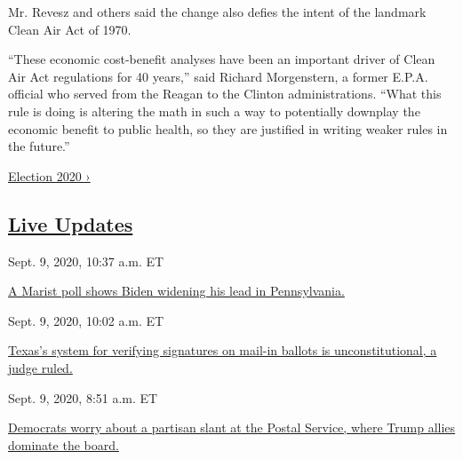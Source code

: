Mr. Revesz and others said the change also defies the intent of the
landmark Clean Air Act of 1970.

``These economic cost-benefit analyses have been an important driver of
Clean Air Act regulations for 40 years,'' said Richard Morgenstern, a
former E.P.A. official who served from the Reagan to the Clinton
administrations. ``What this rule is doing is altering the math in such
a way to potentially downplay the economic benefit to public health, so
they are justified in writing weaker rules in the future.''

\href{https://www.nytimes3xbfgragh.onion/news-event/2020-election}{Election
2020 ›}

\hypertarget{live-updates}{%
\subsection{\texorpdfstring{\href{https://www.nytimes3xbfgragh.onion/live/2020/09/09/us/trump-vs-biden}{Live
Updates}}{Live Updates}}\label{live-updates}}

\href{https://www.nytimes3xbfgragh.onion/live/2020/09/09/us/trump-vs-biden\#a-marist-poll-shows-biden-widening-his-lead-in-pennsylvania}{}

Sept. 9, 2020, 10:37 a.m. ET

\href{https://www.nytimes3xbfgragh.onion/live/2020/09/09/us/trump-vs-biden\#a-marist-poll-shows-biden-widening-his-lead-in-pennsylvania}{A
Marist poll shows Biden widening his lead in
Pennsylvania.}\href{https://www.nytimes3xbfgragh.onion/live/2020/09/09/us/trump-vs-biden\#texass-system-for-verifying-signatures-on-mail-in-ballots-is-unconstitutional-a-judge-ruled}{}

Sept. 9, 2020, 10:02 a.m. ET

\href{https://www.nytimes3xbfgragh.onion/live/2020/09/09/us/trump-vs-biden\#texass-system-for-verifying-signatures-on-mail-in-ballots-is-unconstitutional-a-judge-ruled}{Texas's
system for verifying signatures on mail-in ballots is unconstitutional,
a judge
ruled.}\href{https://www.nytimes3xbfgragh.onion/live/2020/09/09/us/trump-vs-biden\#democrats-worry-about-a-partisan-slant-at-the-postal-service-where-trump-allies-dominate-the-board}{}

Sept. 9, 2020, 8:51 a.m. ET

\href{https://www.nytimes3xbfgragh.onion/live/2020/09/09/us/trump-vs-biden\#democrats-worry-about-a-partisan-slant-at-the-postal-service-where-trump-allies-dominate-the-board}{Democrats
worry about a partisan slant at the Postal Service, where Trump allies
dominate the board.}

